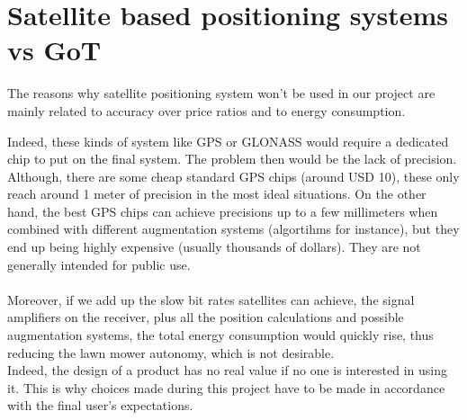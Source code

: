 \section{Satellite based positioning systems vs GoT}
The reasons why satellite positioning system won't be used in our project are mainly related to accuracy over price ratios and to energy consumption.

\noindent
Indeed, these kinds of system like GPS or GLONASS would require a dedicated chip to put on the final system. The problem then would be the lack of precision. Although, there are some cheap standard GPS chips (around USD 10), these only reach around 1 meter of precision in the most ideal situations. %
On the other hand, the best GPS chips can achieve precisions up to a few millimeters when combined with different augmentation systems (algortihms for instance), but they end up being highly expensive (usually thousands of dollars). They are not generally intended for public use.
 \\\\
\noindent
Moreover, if we add up the slow bit rates satellites can achieve, the signal amplifiers on the receiver, plus all the position calculations and possible augmentation systems, the total energy consumption would quickly rise, thus reducing the lawn mower autonomy, which is not desirable.\\
Indeed, the design of a product has no real value if no one is interested in using it. This is why choices made during this project have to be made in accordance with the final user's expectations.\\\\
